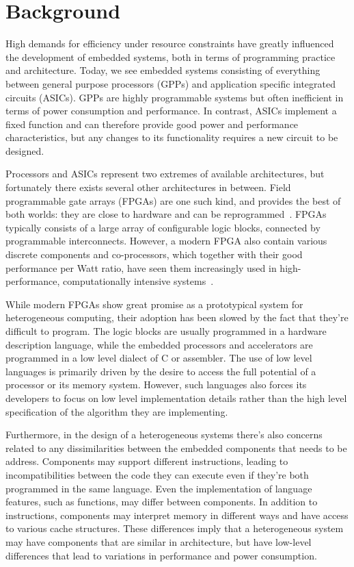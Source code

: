 \documentclass[../main.tex]{subfiles}
\begin{document}
\chapter{Background}
\label{background}

High demands for efficiency under resource constraints have greatly influenced the development of embedded systems, both in terms of programming practice and architecture. Today, we see embedded systems consisting of everything between general purpose processors (GPPs) and application specific integrated circuits (ASICs). GPPs are highly programmable systems but often inefficient in terms of power consumption and performance. In contrast, ASICs implement a fixed function and can therefore provide good power and performance characteristics, but any changes to its functionality requires a new circuit to be designed. 

Processors and ASICs represent two extremes of available architectures, but fortunately there exists several other architectures in between. Field programmable gate arrays (FPGAs) are one such kind, and provides the best of both worlds: they are close to hardware and can be reprogrammed~\cite{bacon2013}. FPGAs typically consists of a large array of configurable logic blocks, connected by programmable interconnects. However, a modern FPGA also contain various discrete components and co-processors, which together with their good performance per Watt ratio, have seen them increasingly used in high-performance, computationally intensive systems~\cite{mcmillan2014}.

While modern FPGAs show great promise as a prototypical system for heterogeneous computing, their adoption has been slowed by the fact that they're difficult to program. The logic blocks are usually programmed in a hardware description language, while the embedded processors and accelerators are programmed in a low level dialect of C or assembler. The use of low level languages is primarily driven by the desire to access the full potential of a processor or its memory system. However, such languages also forces its developers to focus on low level implementation details rather than the high level specification of the algorithm they are implementing.

Furthermore, in the design of a heterogeneous systems there's also concerns related to any dissimilarities between the embedded components that needs to be address. Components may support different instructions, leading to incompatibilities between the code they can execute even if they're both programmed in the same language. Even the implementation of language features, such as functions, may differ between components. In addition to instructions, components may interpret memory in different ways and have access to various cache structures. These differences imply that a heterogeneous system may have components that are similar in architecture, but have low-level differences that lead to variations in performance and power consumption.
\end{document}
